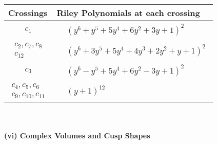 \documentclass[1p]{elsarticle_modified}
\theoremstyle{definition}
\begin{document}
\begin{tabular}{m{50pt}|m{274pt}}
Crossings & \hspace{64pt}Riley Polynomials at each crossing \\
\hline $$\begin{aligned}c_{1}\end{aligned}$$&$\begin{aligned}
&(y^6+y^5+5 y^4+6 y^2+3 y+1)^2
\end{aligned}$\\
\hline $$\begin{aligned}c_{2},c_{7},c_{8}\\c_{12}\end{aligned}$$&$\begin{aligned}
&(y^6+3 y^5+5 y^4+4 y^3+2 y^2+y+1)^2
\end{aligned}$\\
\hline $$\begin{aligned}c_{3}\end{aligned}$$&$\begin{aligned}
&(y^6- y^5+5 y^4+6 y^2-3 y+1)^2
\end{aligned}$\\
\hline $$\begin{aligned}c_{4},c_{5},c_{6}\\c_{9},c_{10},c_{11}\end{aligned}$$&$\begin{aligned}
&(y+1)^{12}
\end{aligned}$\\
\hline
\end{tabular}\\~\\
\newpage\flushleft \textbf{(vi) Complex Volumes and Cusp Shapes}
\end{document}
